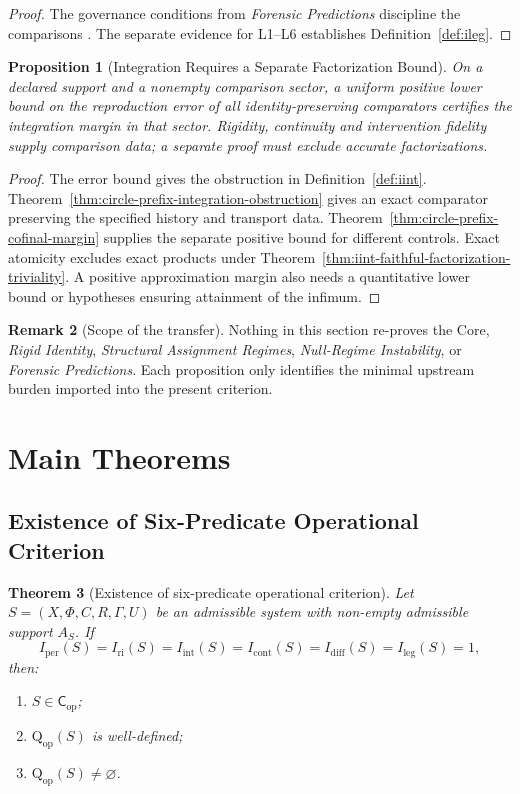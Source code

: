 \documentclass[11pt,a4paper]{article}
\newtheorem{theorem}{Theorem}[section]
\newtheorem{proposition}[theorem]{Proposition}
\theoremstyle{definition}
\newtheorem{remark}[theorem]{Remark}
\newcommand{\Cop}{\mathsf{C}_{\mathrm{op}}}
\newcommand{\Qop}{\mathrm{Q}_{\mathrm{op}}}
\newcommand{\Iper}{I_{\mathrm{per}}}
\newcommand{\Iri}{I_{\mathrm{ri}}}
\newcommand{\Iint}{I_{\mathrm{int}}}
\newcommand{\Icont}{I_{\mathrm{cont}}}
\newcommand{\Idiff}{I_{\mathrm{diff}}}
\newcommand{\Ileg}{I_{\mathrm{leg}}}
\newcommand{\Aset}{A_S}
\begin{document}
\begin{proof}
The governance conditions from \textit{Forensic Predictions} discipline the comparisons \cite{paper4}. The separate evidence for L1--L6 establishes Definition~\ref{def:ileg}.
\end{proof}

\begin{proposition}[Integration Requires a Separate Factorization Bound]\label{prop:integration-transfer}
On a declared support and a nonempty comparison sector, a uniform positive lower bound on the reproduction error of all identity-preserving comparators certifies the integration margin in that sector. Rigidity, continuity and intervention fidelity supply comparison data; a separate proof must exclude accurate factorizations.
\end{proposition}

\begin{proof}
The error bound gives the obstruction in Definition~\ref{def:iint}. Theorem~\ref{thm:circle-prefix-integration-obstruction} gives an exact comparator preserving the specified history and transport data. Theorem~\ref{thm:circle-prefix-cofinal-margin} supplies the separate positive bound for different controls. Exact atomicity excludes exact products under Theorem~\ref{thm:iint-faithful-factorization-triviality}. A positive approximation margin also needs a quantitative lower bound or hypotheses ensuring attainment of the infimum.
\end{proof}

\begin{remark}[Scope of the transfer]
Nothing in this section re-proves the Core, \textit{Rigid Identity}, \textit{Structural Assignment Regimes}, \textit{Null-Regime Instability}, or \textit{Forensic Predictions}. Each proposition only identifies the minimal upstream burden imported into the present criterion.
\end{remark}

\section{Main Theorems}
\subsection{Existence of Six-Predicate Operational Criterion}
\begin{theorem}[Existence of six-predicate operational criterion]\label{thm:existence}
Let $S=(X,\Phi,C,R,\Gamma,U)$ be an admissible system with non-empty admissible support $\Aset$. If
\[
\Iper(S)=\Iri(S)=\Iint(S)=\Icont(S)=\Idiff(S)=\Ileg(S)=1,
\]
then:
\begin{enumerate}[leftmargin=1.5em]
\item $S \in \Cop$;
\item $\Qop(S)$ is well-defined;
\item $\Qop(S) \neq \varnothing$.
\end{enumerate}
\end{theorem}
\end{document}
